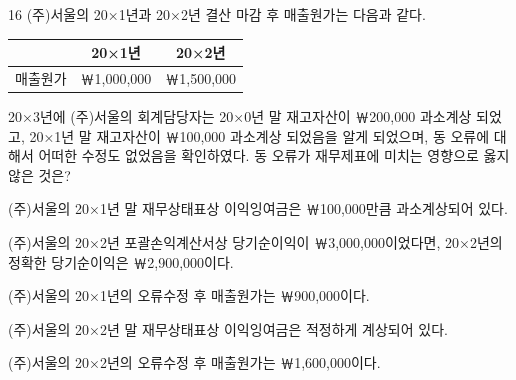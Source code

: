 \begin{question}{16}
(주)서울의 20×1년과 20×2년 결산 마감 후 매출원가는 다음과 같다.

{\small\centering
\begin{tabular}{|c|c|c|}
\hline
 & 20×1년 & 20×2년 \\
\hline
매출원가 & ￦1,000,000 & ￦1,500,000 \\
\hline
\end{tabular}\par}

20×3년에 (주)서울의 회계담당자는 20×0년 말 재고자산이 ￦200,000 과소계상 되었고, 20×1년 말 재고자산이 ￦100,000 과소계상 되었음을 알게 되었으며, 동 오류에 대해서 어떠한 수정도 없었음을 확인하였다. 동 오류가 재무제표에 미치는 영향으로 옳지 않은 것은? \par
\begin{choices}
  \item (주)서울의 20×1년 말 재무상태표상 이익잉여금은 ￦100,000만큼 과소계상되어 있다.
  \item (주)서울의 20×2년 포괄손익계산서상 당기순이익이 ￦3,000,000이었다면, 20×2년의 정확한 당기순이익은 ￦2,900,000이다.
  \item (주)서울의 20×1년의 오류수정 후 매출원가는 ￦900,000이다.
  \item (주)서울의 20×2년 말 재무상태표상 이익잉여금은 적정하게 계상되어 있다.
  \item (주)서울의 20×2년의 오류수정 후 매출원가는 ￦1,600,000이다.
\end{choices}
\end{question}
